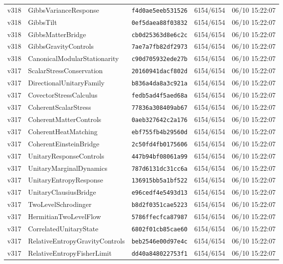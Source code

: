 \documentclass[11pt]{article}
\theoremstyle{definition}\newtheorem{deriv}{Derivation}
\begin{document}
{\begin{longtable}{@{}lllll@{}}
v318 & GibbsVarianceResponse & \texttt{f4d0ae5eeb531526} & 6154/6154 & 06/10 15:22:07 \\
v318 & GibbsTilt & \texttt{0ef5daea88f03832} & 6154/6154 & 06/10 15:22:07 \\
v318 & GibbsMatterBridge & \texttt{cb0d25363d8e6c2c} & 6154/6154 & 06/10 15:22:07 \\
v318 & GibbsGravityControls & \texttt{7ae7a7fb82df2973} & 6154/6154 & 06/10 15:22:07 \\
v318 & CanonicalModularStationarity & \texttt{c90d705932ede27b} & 6154/6154 & 06/10 15:22:07 \\
v317 & ScalarStressConservation & \texttt{20160941dacf802d} & 6154/6154 & 06/10 15:22:07 \\
v317 & DirectionalUnitaryFamily & \texttt{b836a4da8a3c921a} & 6154/6154 & 06/10 15:22:07 \\
v317 & CovectorStressCalculus & \texttt{fedb5ad4f5aed68a} & 6154/6154 & 06/10 15:22:07 \\
v317 & CoherentScalarStress & \texttt{77836a308409ab67} & 6154/6154 & 06/10 15:22:07 \\
v317 & CoherentMatterControls & \texttt{0aeb327642c2a176} & 6154/6154 & 06/10 15:22:07 \\
v317 & CoherentHeatMatching & \texttt{ebf755fb4b29560d} & 6154/6154 & 06/10 15:22:07 \\
v317 & CoherentEinsteinBridge & \texttt{2c50fd4fb0175606} & 6154/6154 & 06/10 15:22:07 \\
v317 & UnitaryResponseControls & \texttt{447b94bf08061a99} & 6154/6154 & 06/10 15:22:07 \\
v317 & UnitaryMarginalDynamics & \texttt{787d6131dc31cc6a} & 6154/6154 & 06/10 15:22:07 \\
v317 & UnitaryEntropyResponse & \texttt{136915bb5a1bf522} & 6154/6154 & 06/10 15:22:07 \\
v317 & UnitaryClausiusBridge & \texttt{e96cedf4e5493d13} & 6154/6154 & 06/10 15:22:07 \\
v317 & TwoLevelSchrodinger & \texttt{b8d2f0351cae5223} & 6154/6154 & 06/10 15:22:07 \\
v317 & HermitianTwoLevelFlow & \texttt{5786ffecfca87987} & 6154/6154 & 06/10 15:22:07 \\
v317 & CorrelatedUnitaryState & \texttt{6802f01cb85cae60} & 6154/6154 & 06/10 15:22:07 \\
v317 & RelativeEntropyGravityControls & \texttt{beb2546e00d97e4c} & 6154/6154 & 06/10 15:22:07 \\
v317 & RelativeEntropyFisherLimit & \texttt{dd40a848022753f1} & 6154/6154 & 06/10 15:22:07 \\

\end{longtable}}
\end{document}
